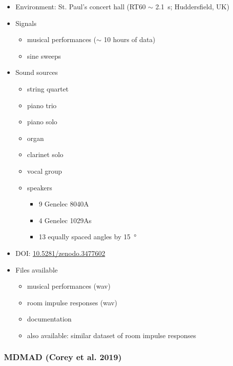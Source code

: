 \documentclass[14pt, oneside]{extarticle}
\begin{document}
\begin{itemize}
\item Environment: St. Paul's concert hall (RT60 $\sim$ \SI{2.1}{\second}; Huddersfield, UK)

\item Signals
	\begin{itemize}
	\item musical performances ($\sim$ 10 hours of data)
	\item sine sweeps
	\end{itemize}

\item Sound sources
	\begin{itemize}
	\item string quartet
	\item piano trio
	\item piano solo
	\item organ
	\item clarinet solo
	\item vocal group
	\item speakers
		\begin{itemize}
		\item 9 Genelec 8040A
		\item 4 Genelec 1029As
		\item 13 equally spaced angles by \SI{15}{\degree}
		\end{itemize}
	\end{itemize}

\item DOI: \href{https://zenodo.org/record/3477602}{10.5281/zenodo.3477602}

\item Files available
	\begin{itemize}
	\item musical performances (wav)
	\item room impulse responses (wav)
	\item documentation
	\item also available: similar dataset of room impulse responses \cite{lee2017microphone}
	\end{itemize}

\end{itemize}

\subsubsection{MDMAD (Corey et al. 2019)}
\end{document}
